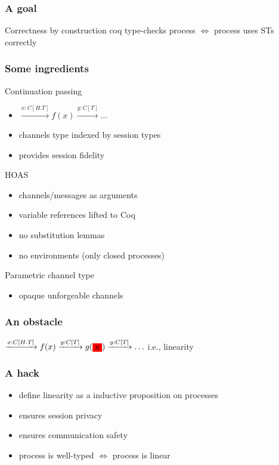 \documentclass{beamer}
\begin{document}
\begin{frame}
    \frametitle{A goal}
    \begin{block}{Correctness by construction}
    coq type-checks process $\iff$ process uses STs correctly
    \end{block}
\end{frame}

\begin{frame}
    \frametitle{Some ingredients}
    \begin{block}{Continuation passing}
        \begin{itemize}
            \item $\xrightarrow{x : C[H.T]} f(x) \xrightarrow{y : C[T]} \ldots$
            \item channels type indexed by session types
            \item provides session fidelity
        \end{itemize}
    \end{block}

    \begin{block}{HOAS}
        \begin{itemize}
            \item channels/messages as arguments
            \item variable references lifted to Coq
            \item no substitution lemmas
            \item no environments (only closed processes)
        \end{itemize}
    \end{block}

    \begin{block}{Parametric channel type}
        \begin{itemize}
            \item opaque unforgeable channels
        \end{itemize}
    \end{block}
\end{frame}

\begin{frame}
    \frametitle{An obstacle}
    \centering
    \LARGE
    $
    \xrightarrow{x : C[H.T]} f(x)
    \xrightarrow{y : C[T]} g(\colorbox{red}{x})
    \xrightarrow{y : C[T]} \ldots$
    \vfill
    i.e., linearity
\end{frame}

\begin{frame}
    \frametitle{A hack}
    \begin{itemize}
        \item define linearity as a inductive proposition on processes
        \item ensures session privacy
        \item ensures communication safety
        \item process is well-typed $\iff$ process is linear
    \end{itemize}
\end{frame}
\end{document}
